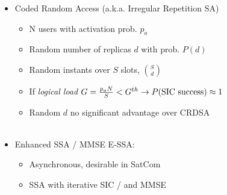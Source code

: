 \documentclass[xcolor=dvipsnames,aspectratio=169]{beamer}
\begin{document}
{\begin{itemize}
\begin{itemize}
\begin{figure}
    \end{figure}
 \end{itemize}
    \item Coded Random Access (a.k.a. Irregular Repetition SA)
    \begin{itemize}
       \item N users with activation prob. $p_a$
       \item Random number of replicas $d$ with prob. $P(d)$
       \item Random instants over $S$ slots, ${S \choose d}$
       \item If \textit{logical load} $G=\frac{p_aN}{S}<G^{th}\to P(\textnormal{SIC success})\approx 1$
       \item Random $d$ no significant advantage over CRDSA\\ \ \\
    \end{itemize}
    \item Enhanced SSA / MMSE E-SSA:
    \begin{itemize}
       \item Asynchronous, desirable in SatCom
       \item SSA with iterative SIC / and MMSE
    \end{itemize}
 \end{itemize}
}
\end{document}
